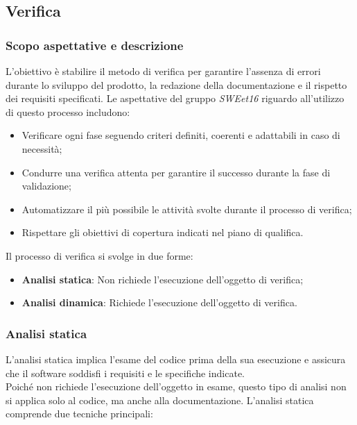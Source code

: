 \nonstopmode
\pagebreak
\subsection{Verifica}
\subsubsection{Scopo aspettative e descrizione}
L'obiettivo è stabilire il metodo di verifica per garantire l'assenza
di errori durante lo sviluppo del prodotto, la redazione della documentazione
e il rispetto dei requisiti specificati.
Le aspettative del gruppo \emph{SWEet16} riguardo all'utilizzo di questo processo includono:

\begin{itemize}
\item Verificare ogni fase seguendo criteri definiti, coerenti e adattabili in caso di necessità;
\item Condurre una verifica attenta per garantire il successo durante la fase di validazione;
\item Automatizzare il più possibile le attività svolte durante il processo di verifica;
\item Rispettare gli obiettivi di copertura indicati nel piano di qualifica.
\end{itemize}
Il processo di verifica si svolge in due forme:

\begin{itemize}
\item \textbf{Analisi statica}: Non richiede l'esecuzione dell'oggetto di verifica;
\item \textbf{Analisi dinamica}: Richiede l'esecuzione dell'oggetto di verifica.
\end{itemize}
\subsubsection{Analisi statica}
L'analisi statica implica l'esame del codice prima della sua esecuzione e assicura che il software soddisfi i requisiti
e le specifiche indicate. \\
Poiché non richiede l'esecuzione dell'oggetto in esame, questo tipo di analisi non si applica solo al codice, ma anche alla documentazione.
L'analisi statica comprende due tecniche principali:

